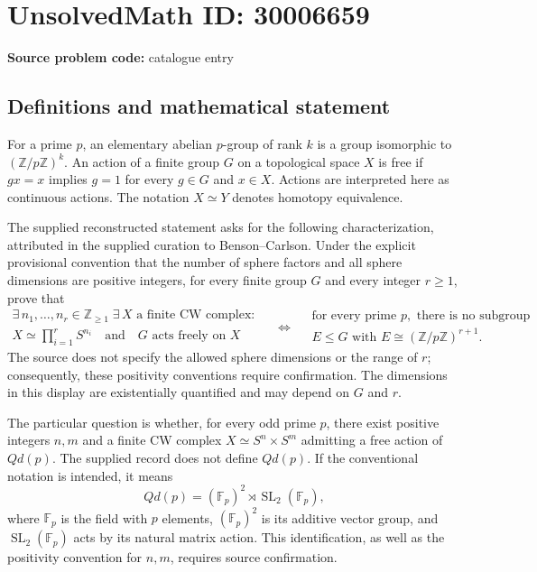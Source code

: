 \documentclass[11pt]{article}
\newcommand{\Z}{\mathbb{Z}}
\newcommand{\F}{\mathbb{F}}
\begin{document}
\section*{UnsolvedMath ID: 30006659}
\textbf{Source problem code:} catalogue entry
\subsection{Definitions and mathematical statement}
For a prime \(p\), an elementary abelian \(p\)-group of rank \(k\) is a group isomorphic to \((\Z/p\Z)^k\). An action of a finite group \(G\) on a topological space \(X\) is free if \(gx=x\) implies \(g=1\) for every \(g\in G\) and \(x\in X\). Actions are interpreted here as continuous actions. The notation \(X\simeq Y\) denotes homotopy equivalence.

The supplied reconstructed statement asks for the following characterization, attributed in the supplied curation to Benson--Carlson. Under the explicit provisional convention that the number of sphere factors and all sphere dimensions are positive integers, for every finite group \(G\) and every integer \(r\geq 1\), prove that
\[
\begin{gathered}
\exists\, n_1,\ldots,n_r\in\Z_{\geq 1}\;\exists\, X\text{ a finite CW complex}:\\
X\simeq\prod_{i=1}^{r}S^{n_i}
\quad\text{and}\quad G\text{ acts freely on }X
\end{gathered}
\quad\Longleftrightarrow\quad
\begin{gathered}
\text{for every prime }p,\text{ there is no subgroup}\\
E\leq G\text{ with }E\cong(\Z/p\Z)^{r+1}.
\end{gathered}
\]
The source does not specify the allowed sphere dimensions or the range of \(r\); consequently, these positivity conventions require confirmation. The dimensions in this display are existentially quantified and may depend on \(G\) and \(r\).

The particular question is whether, for every odd prime \(p\), there exist positive integers \(n,m\) and a finite CW complex \(X\simeq S^n\times S^m\) admitting a free action of \(Qd(p)\). The supplied record does not define \(Qd(p)\). If the conventional notation is intended, it means
\[
Qd(p)=(\F_p)^2\rtimes\operatorname{SL}_2(\F_p),
\]
where \(\F_p\) is the field with \(p\) elements, \((\F_p)^2\) is its additive vector group, and \(\operatorname{SL}_2(\F_p)\) acts by its natural matrix action. This identification, as well as the positivity convention for \(n,m\), requires source confirmation.
\end{document}
